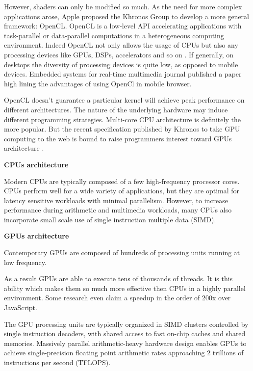 However, shaders can only be modified so much. As the need for more complex
applications arose, Apple proposed the Khronos Group to develop a more general
framework: OpenCL. OpenCL is a low-level API accelerating applications with
task-parallel or data-parallel computations in a heterogeneous computing
environment. Indeed OpenCL not only allows the usage of CPUs but also any
processing devices like GPUs, DSPs, accelerators and so on \citep{Reference5}.
If generally, on desktops the diversity of processing devices is quite low, as
opposed to mobile devices. Embedded systems for real-time multimedia journal
published a paper \citep{Reference3} high lining the advantages of using OpenCl
in mobile browser.

OpenCL doesn't guarantee a particular kernel will achieve peak performance on
different architectures. The nature of the underlying hardware may induce
different programming strategies. Multi-core CPU architecture is definitely the
more popular. But the recent specification published by Khronos to take GPU
computing to the web is bound to raise programmers interest toward GPUs
architecture \citep{Reference30}. 

\textbf{CPUs architecture}

Modern CPUs are typically composed of a few high-frequency processor cores.
CPUs perform well for a wide variety of applications, but they are optimal for
latency sensitive workloads with minimal parallelism. However, to increase
performance during arithmetic and multimedia workloads,  many CPUs also
incorporate small scale use of single instruction multiple data (SIMD).

\textbf{GPUs architecture}

Contemporary GPUs are composed of hundreds of processing units running at low
frequency. 

As a result GPUs are able to execute tens of thousands of threads. It is this
ability which makes them so much more effective then CPUs in a highly parallel
environment. Some research even claim a speedup in the order of 200x over
JavaScript. \citep{Reference3}

The GPU processing units are typically organized in SIMD clusters controlled by
single instruction decoders, with shared access to fast on-chip caches and
shared memories. Massively parallel arithmetic-heavy hardware design enables
GPUs to achieve single-precision floating point arithmetic rates approaching 2
trillions of instructions per second (TFLOPS). \citep{Reference5}


